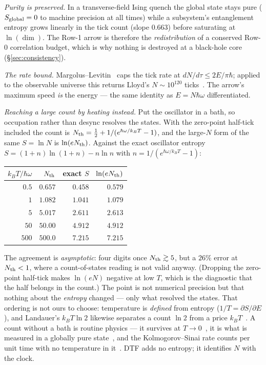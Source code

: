 \documentclass[11pt]{article}
\begin{document}
\emph{Purity is preserved.} In a transverse-field Ising quench the global state stays pure
($S_{\rm global}=0$ to machine precision at all times) while a subsystem's entanglement entropy grows linearly
in the tick count (slope $0.663$) before saturating at $\ln(\dim)$. The Row-1 arrow is therefore the
\emph{redistribution} of a conserved Row-0 correlation budget, which is why nothing is destroyed at a
black-hole core (\S\ref{sec:consistency}).

\emph{The rate bound.} Margolus--Levitin~\cite{MargolusLevitin1998} caps the tick rate at
$dN/d\tau\le 2E/\pi\hbar$; applied to the observable universe this returns Lloyd's $N\sim10^{120}$
ticks~\cite{Lloyd2002}. The arrow's maximum speed \emph{is} the energy --- the same identity as $E=N\hbar\omega$
differentiated.

\emph{Reaching a large count by heating instead.} Put the oscillator in a bath, so occupation rather than
desync resolves the states. With the zero-point half-tick included the count is
$N_{\rm th}=\tfrac12+1/(e^{\hbar\omega/k_BT}-1)$, and the large-$N$ form of the same $S=\ln N$ is
$\ln(eN_{\rm th})$. Against the exact oscillator entropy $S=(1{+}n)\ln(1{+}n)-n\ln n$ with
$n=1/(e^{\hbar\omega/k_BT}-1)$:
\begin{center}\small
\begin{tabular}{@{}rrrr@{}}
\toprule
$k_BT/\hbar\omega$ & $N_{\rm th}$ & exact $S$ & $\ln(eN_{\rm th})$\\\midrule
$0.5$ & $0.657$ & $0.458$ & $0.579$\\
$1$ & $1.082$ & $1.041$ & $1.079$\\
$5$ & $5.017$ & $2.611$ & $2.613$\\
$50$ & $50.00$ & $4.912$ & $4.912$\\
$500$ & $500.0$ & $7.215$ & $7.215$\\
\bottomrule
\end{tabular}
\end{center}
\noindent The agreement is \emph{asymptotic}: four digits once $N_{\rm th}\gtrsim5$, but a $26\%$ error at
$N_{\rm th}<1$, where a count-of-states reading is not valid anyway. (Dropping the zero-point half-tick makes
$\ln(eN)$ negative at low $T$, which is the diagnostic that the half belongs in the count.) The point is not
numerical precision but that nothing about the \emph{entropy} changed --- only what resolved the states. That
ordering is not ours to choose: temperature is \emph{defined} from entropy ($1/T=\partial S/\partial E$), and
Landauer's $k_BT\ln2$ likewise separates a count $\ln2$ from a price $k_BT$~\cite{Landauer1961,Berut2012}. A
count without a bath is routine physics --- it survives at $T\to0$~\cite{Pauling1935}, it is what is measured
in a globally pure state~\cite{Kaufman2016}, and the Kolmogorov--Sinai rate counts per unit time with no
temperature in it~\cite{Pesin1977}. DTF adds no entropy; it identifies $N$ with the clock.
\end{document}
